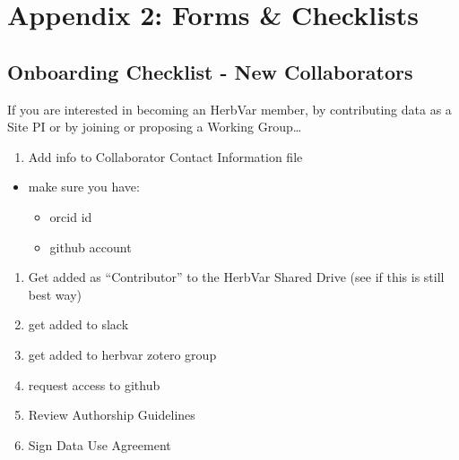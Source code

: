 \documentclass[
  letterpaper,
  oneside,
  open=any]{scrbook}
\providecommand{\tightlist}{%
  \setlength{\itemsep}{0pt}\setlength{\parskip}{0pt}}\usepackage{longtable,booktabs,array}
\begin{document}
\begin{figure}


\caption{\label{fig-herbvivores5}}

\end{figure}%

\part{Appendix 2: Forms \& Checklists}

\chapter{Onboarding Checklist - New
Collaborators}\label{onboarding-checklist---new-collaborators}

If you are interested in becoming an HerbVar member, by contributing
data as a Site PI or by joining or proposing a Working Group\ldots{}

\begin{enumerate}
\def\labelenumi{\arabic{enumi}.}
\tightlist
\item
  Add info to Collaborator Contact Information file
\end{enumerate}

\begin{itemize}
\tightlist
\item
  make sure you have:

  \begin{itemize}
  \tightlist
  \item
    orcid id
  \item
    github account
  \end{itemize}
\end{itemize}

\begin{enumerate}
\def\labelenumi{\arabic{enumi}.}
\tightlist
\item
  Get added as ``Contributor'' to the HerbVar Shared Drive (see if this
  is still best way)
\item
  get added to slack
\item
  get added to herbvar zotero group
\item
  request access to github
\item
  Review Authorship Guidelines
\item
  Sign Data Use Agreement
\end{enumerate}
\end{document}

